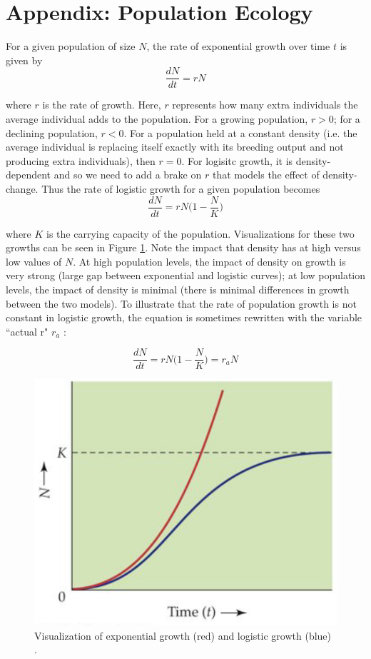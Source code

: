 \documentclass{article}
\begin{document}
\section{Appendix: Population Ecology} \label{SECTION_APPENDIX_POPULATION_ECOLOGY}

For a given population of size $N$, the rate of exponential growth over time $t$ is given by
$$\frac{dN}{dt} = rN$$

where $r$ is the rate of growth. Here, $r$ represents how many extra individuals the average individual adds to the population. For a growing population, $r>0$; for a declining population, $r<0$. For a population held at a constant density (i.e. the average individual is replacing itself exactly with its breeding output and not producing extra individuals), then $r=0$. For logisitc growth, it is density-dependent and so we need to add a brake on $r$ that models the effect of density-change. Thus the rate of logistic growth for a given population becomes
$$\frac{dN}{dt} = rN\Big(1 - \frac{N}{K}\Big)$$

where $K$ is the carrying capacity of the population. Visualizations for these two growths can be seen in Figure \ref{Logistic_Exponential_Growth}. Note the impact that density has at high versus low values of $N$. At high population levels, the impact of density on growth is very strong (large gap between exponential and logistic curves); at low population levels, the impact of density is minimal (there is minimal differences in growth between the two models). To illustrate that the rate of population growth is not constant in logistic growth, the equation is sometimes rewritten with the variable ``actual r" $r_a$ \cite{waynegoodey2014biology230}:

$$\frac{dN}{dt} = rN\Big(1 - \frac{N}{K}\Big) = r_aN$$  

\begin{figure}[h]
    \includegraphics[width=.6 \textwidth]{./images_moores/Logistic_Exponential_Growth.png}
    \centering
    \caption{Visualization of exponential growth (red) and logistic growth (blue) \cite{cain2011ecology}.}
    \label{Logistic_Exponential_Growth}
\end{figure}
\end{document}
